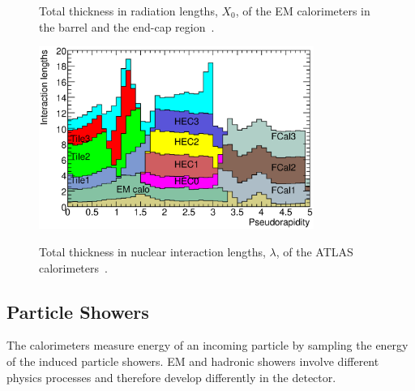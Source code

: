 \begin{figure}[htbp]
\begin{center}
\caption[Radiation lengths in ATLAS electromagnetic calorimeters]{Total thickness in radiation lengths, $X_0$, of the EM calorimeters in \protect{} the barrel and \protect{} the end-cap region~\cite{ATLAS}.}
\label{fig:x0_cal}
\includegraphics[width=0.8\textwidth]{figures/ATLAS/lambda_cal}
\caption[Interaction lengths in ATLAS calorimeters]{Total thickness in nuclear interaction lengths, $\lambda$, of the ATLAS calorimeters~\cite{ATLAS}.}
\label{fig:lambda_cal}
\end{center}
\end{figure}

%
\subsection{Particle Showers}
\label{ch:atlas:particle_showers}
The calorimeters measure energy of an incoming particle by sampling the energy of the induced particle showers. EM and hadronic showers involve different physics processes and therefore develop differently in the detector\cite{pdg_2017}. 

